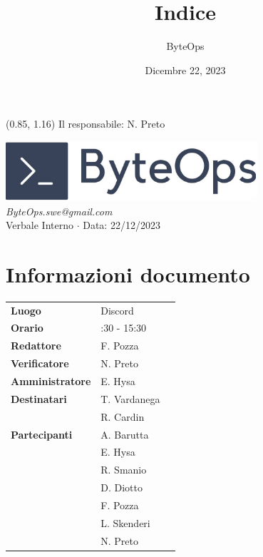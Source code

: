 \documentclass{article}
\title{\textbf{\fontsize{28}{6}\selectfont Indice}}
\author{\fontsize{14}{6}\selectfont ByteOps}
\date{Dicembre 22, 2023}
\begin{document}
\begin{textblock*}{\textwidth}(0.85\textwidth, 1.16\textheight)
    Il responsabile: N. Preto
\end{textblock*}

\pagestyle{fancy}
\begin{center}
\includegraphics[width = 0.7\textwidth]{../../../Images/logo.png} \\
\vspace{0.2cm}
\textcolor[RGB]{60, 60, 60}{\textit{ByteOps.swe@gmail.com}} \\
\vspace{1cm}
\fontsize{16}{6}\selectfont Verbale Interno $\cdot$ Data: 22/12/2023 \\
\vspace{0.5cm}
\end{center}

\section*{Informazioni documento}
\def\arraystretch{1.2}
\begin{tabular}{>{\raggedleft\arraybackslash}p{}|>{\raggedright\arraybackslash}p{}c}
\hline
\addlinespace
\textbf{Luogo} & Discord \vspace{10pt} \\
\textbf{Orario} & 14:30 - 15:30 \vspace{10pt} \\
\textbf{Redattore} & F. Pozza \vspace{10pt} \\
\textbf{Verificatore} & N. Preto \vspace{10pt} \\
\textbf{Amministratore} & E. Hysa \vspace{10pt} \\
\textbf{Destinatari} & T. Vardanega \\ & R. Cardin \vspace{10pt} \\
\textbf{Partecipanti} & A. Barutta \\ & E. Hysa \\ & R. Smanio \\ & D. Diotto \\ & F. Pozza \\ & L. Skenderi \\ & N. Preto \vspace{10pt} \\
\end{tabular}
\pagebreak 
\end{document}
